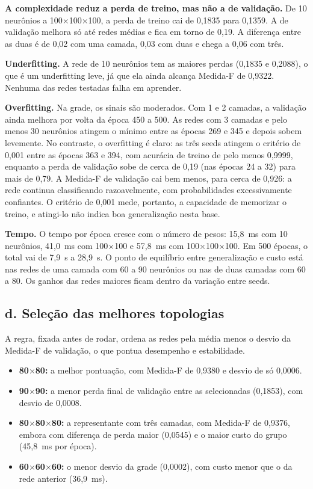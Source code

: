 \textbf{A complexidade reduz a perda de treino, mas não a de validação.} De 10 neurônios a 100$\times$100$\times$100, a perda de treino cai de 0,1835
para 0,1359. A de validação melhora só até redes médias e fica em torno de 0,19. A diferença entre as duas é de 0,02 com uma camada,
0,03 com duas e chega a 0,06 com três.

\textbf{Underfitting.} A rede de 10 neurônios tem as maiores perdas (0,1835 e 0,2088), o que é um underfitting leve, já que ela ainda alcança Medida-F
de 0,9322. Nenhuma das redes testadas falha em aprender.

\textbf{Overfitting.} Na grade, os sinais são moderados. Com 1 e 2 camadas, a validação ainda melhora por volta da época 450 a 500. As redes com
3 camadas e pelo menos 30 neurônios atingem o mínimo entre as épocas 269 e 345 e depois sobem levemente. No contraste, o
overfitting é claro: as três seeds atingem o critério de 0,001 entre as épocas 363 e 394, com acurácia de treino de pelo menos 0,9999, enquanto a
perda de validação sobe de cerca de 0,19 (nas épocas 24 a 32) para mais de 0,79. A Medida-F de validação cai bem menos, para cerca de 0,926: a rede
continua classificando razoavelmente, com probabilidades excessivamente confiantes. O critério de 0,001 mede, portanto, a capacidade de memorizar o treino,
e atingi-lo não indica boa generalização nesta base.

\textbf{Tempo.} O tempo por época cresce com o número de pesos: 15,8~ms com 10 neurônios, 41,0~ms com 100$\times$100 e 57,8~ms com
100$\times$100$\times$100. Em 500 épocas, o total vai de 7,9~s a 28,9~s. O ponto de equilíbrio entre generalização e custo está nas redes de uma camada com
60 a 90 neurônios ou nas de duas camadas com 60 a 80. Os ganhos das redes maiores ficam dentro da variação entre seeds.

\subsection*{d. Seleção das melhores topologias}

A regra, fixada antes de rodar, ordena as redes pela média menos o desvio da Medida-F de validação, o que pontua desempenho e estabilidade.


\begin{itemize}
  \item \textbf{80$\times$80:} a melhor pontuação, com Medida-F de 0,9380 e desvio de só 0,0006.
  \item \textbf{90$\times$90:} a menor perda final de validação entre as selecionadas (0,1853), com desvio de 0,0008.
  \item \textbf{80$\times$80$\times$80:} a representante com três camadas, com Medida-F de 0,9376, embora com diferença de perda maior (0,0545) e o maior custo do grupo (45,8~ms por época).
  \item \textbf{60$\times$60$\times$60:} o menor desvio da grade (0,0002), com custo menor que o da rede anterior (36,9~ms).
\end{itemize}

